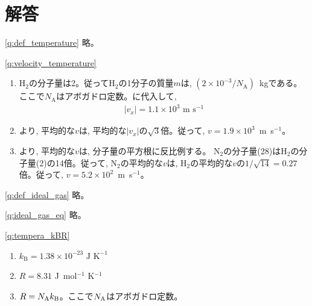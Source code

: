 \section{解答}

\ref{q:def_temperature} 略。
\vspace{0.2cm}

\ref{q:velocity_temperature}　
\begin{enumerate}
\item H$_2$の分子量は2。従ってH$_2$の1分子の質量$m$は, $(2\times10^{-3}/N_\text{A})$~kgである。
ここで$N_\text{A}$はアボガドロ定数。に代入して, 
\begin{eqnarray*}|v_x|=1.1\times10^{3}\text{ m s}^{-1}\end{eqnarray*}
\item {}より, 平均的な$v$は, 平均的な$|v_x|$の$\sqrt{3}$倍。従って, $v=1.9\times10^{3}$~m~s$^{-1}$。
\item {}より, 平均的な$v$は, 分子量の平方根に反比例する。
N$_2$の分子量(28)はH$_2$の分子量(2)の14倍。従って, N$_2$の平均的な$v$は, H$_2$の平均的な$v$の$1/\sqrt{14}=0.27$倍。従って, 
$v=5.2\times10^{2}$~m~s$^{-1}$。
\end{enumerate}
\vspace{0.2cm}
\ref{q:def_ideal_gas} 略。
\vspace{0.2cm}

\ref{q:ideal_gas_eq} 略。
\vspace{0.2cm}

\ref{q:tempera_kBR}　
\begin{enumerate}
\item $k_{\text{B}}=1.38\times10^{-23} \text{ J K}^{-1}$
\item $R=8.31$ J~mol$^{-1}$ K$^{-1}$
\item $R=N_{\text A}k_{\text B}$。ここで$N_{\text A}$はアボガドロ定数。
\end{enumerate}
\vspace{0.2cm}

